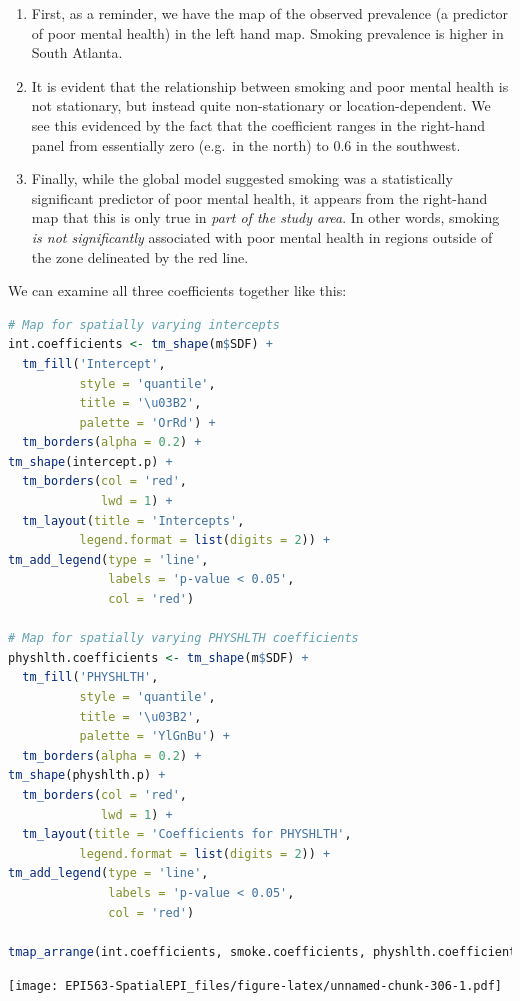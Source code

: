\documentclass[
]{book}
\providecommand{\tightlist}{%
  \setlength{\itemsep}{0pt}\setlength{\parskip}{0pt}}
\begin{document}
\begin{enumerate}
\def\labelenumi{\arabic{enumi}.}
\tightlist
\item
  First, as a reminder, we have the map of the observed prevalence (a predictor of poor mental health) in the left hand map. Smoking prevalence is higher in South Atlanta.
\item
  It is evident that the relationship between smoking and poor mental health is not stationary, but instead quite non-stationary or location-dependent. We see this evidenced by the fact that the coefficient ranges in the right-hand panel from essentially zero (e.g.~in the north) to 0.6 in the southwest.
\item
  Finally, while the global model suggested smoking was a statistically significant predictor of poor mental health, it appears from the right-hand map that this is only true in \emph{part of the study area}. In other words, smoking \emph{is not significantly} associated with poor mental health in regions outside of the zone delineated by the red line.
\end{enumerate}

We can examine all three coefficients together like this:

\begin{lstlisting}[language=R]
# Map for spatially varying intercepts
int.coefficients <- tm_shape(m$SDF) +
  tm_fill('Intercept',
          style = 'quantile',
          title = '\u03B2',
          palette = 'OrRd') +
  tm_borders(alpha = 0.2) +
tm_shape(intercept.p) +
  tm_borders(col = 'red', 
             lwd = 1) +
  tm_layout(title = 'Intercepts',
          legend.format = list(digits = 2)) +
tm_add_legend(type = 'line',
              labels = 'p-value < 0.05',
              col = 'red')

# Map for spatially varying PHYSHLTH coefficients
physhlth.coefficients <- tm_shape(m$SDF) +
  tm_fill('PHYSHLTH',
          style = 'quantile',
          title = '\u03B2',
          palette = 'YlGnBu') +
  tm_borders(alpha = 0.2) +
tm_shape(physhlth.p) +
  tm_borders(col = 'red', 
             lwd = 1) +
  tm_layout(title = 'Coefficients for PHYSHLTH',
          legend.format = list(digits = 2)) +
tm_add_legend(type = 'line',
              labels = 'p-value < 0.05',
              col = 'red')

tmap_arrange(int.coefficients, smoke.coefficients, physhlth.coefficients)
\end{lstlisting}

\texttt{[image: EPI563-SpatialEPI\_files/figure-latex/unnamed-chunk-306-1.pdf]}
\end{document}
